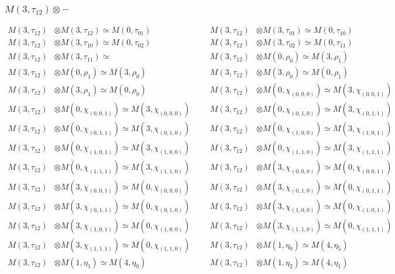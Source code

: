 \subsubsection{$ M(3,\tau_{12})\otimes -$}
\begin{align*}
M(3,\tau_{12}) &\otimes M(3,\tau_{12}) \simeq M(0,\tau_{01}) &&& M(3,\tau_{12}) &\otimes M(3,\tau_{01}) \simeq M(0,\tau_{10})\\
M(3,\tau_{12}) &\otimes M(3,\tau_{10}) \simeq M(0,\tau_{02}) &&& M(3,\tau_{12}) &\otimes M(3,\tau_{02}) \simeq M(0,\tau_{11})\\
M(3,\tau_{12}) &\otimes M(3,\tau_{11}) \simeq  &&& M(3,\tau_{12}) &\otimes M(0,\rho_{0}) \simeq M(3,\rho_{1})\\
M(3,\tau_{12}) &\otimes M(0,\rho_{1}) \simeq M(3,\rho_{0}) &&& M(3,\tau_{12}) &\otimes M(3,\rho_{0}) \simeq M(0,\rho_{1})\\
M(3,\tau_{12}) &\otimes M(3,\rho_{1}) \simeq M(0,\rho_{0}) &&& M(3,\tau_{12}) &\otimes M(0,\chi_{(0,0,0)}) \simeq M(3,\chi_{(0,0,1)})\\
M(3,\tau_{12}) &\otimes M(0,\chi_{(0,0,1)}) \simeq M(3,\chi_{(0,0,0)}) &&& M(3,\tau_{12}) &\otimes M(0,\chi_{(0,1,0)}) \simeq M(3,\chi_{(0,1,1)})\\
M(3,\tau_{12}) &\otimes M(0,\chi_{(0,1,1)}) \simeq M(3,\chi_{(0,1,0)}) &&& M(3,\tau_{12}) &\otimes M(0,\chi_{(1,0,0)}) \simeq M(3,\chi_{(1,0,1)})\\
M(3,\tau_{12}) &\otimes M(0,\chi_{(1,0,1)}) \simeq M(3,\chi_{(1,0,0)}) &&& M(3,\tau_{12}) &\otimes M(0,\chi_{(1,1,0)}) \simeq M(3,\chi_{(1,1,1)})\\
M(3,\tau_{12}) &\otimes M(0,\chi_{(1,1,1)}) \simeq M(3,\chi_{(1,1,0)}) &&& M(3,\tau_{12}) &\otimes M(3,\chi_{(0,0,0)}) \simeq M(0,\chi_{(0,0,1)})\\
M(3,\tau_{12}) &\otimes M(3,\chi_{(0,0,1)}) \simeq M(0,\chi_{(0,0,0)}) &&& M(3,\tau_{12}) &\otimes M(3,\chi_{(0,1,0)}) \simeq M(0,\chi_{(0,1,1)})\\
M(3,\tau_{12}) &\otimes M(3,\chi_{(0,1,1)}) \simeq M(0,\chi_{(0,1,0)}) &&& M(3,\tau_{12}) &\otimes M(3,\chi_{(1,0,0)}) \simeq M(0,\chi_{(1,0,1)})\\
M(3,\tau_{12}) &\otimes M(3,\chi_{(1,0,1)}) \simeq M(0,\chi_{(1,0,0)}) &&& M(3,\tau_{12}) &\otimes M(3,\chi_{(1,1,0)}) \simeq M(0,\chi_{(1,1,1)})\\
M(3,\tau_{12}) &\otimes M(3,\chi_{(1,1,1)}) \simeq M(0,\chi_{(1,1,0)}) &&& M(3,\tau_{12}) &\otimes M(1,\eta_{0}) \simeq M(4,\eta_{5})\\
M(3,\tau_{12}) &\otimes M(1,\eta_{1}) \simeq M(4,\eta_{0}) &&& M(3,\tau_{12}) &\otimes M(1,\eta_{2}) \simeq M(4,\eta_{1})\\

\end{align*}
